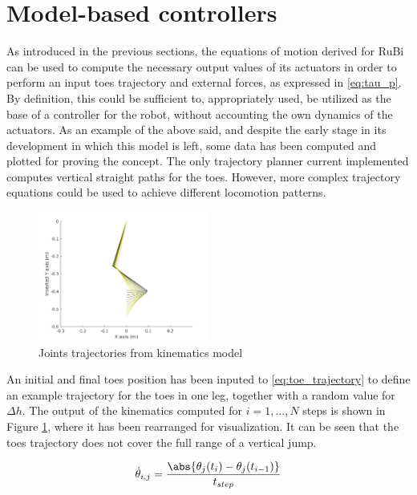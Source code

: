 
\section{Model-based controllers}
\label{sec_dynamic_controller}
As introduced in the previous sections, the equations of motion derived for RuBi can be used to compute the necessary output values of its actuators in order to perform an input toes trajectory and external forces, as expressed in \ref{eq:tau_p}.
By definition, this could be sufficient to, appropriately used, be utilized as the base of a controller for the robot, without accounting the own dynamics of the actuators.
As an example of the above said, and despite the early stage in its development in which this model is left, some data has been computed and plotted for proving the concept.
The only trajectory planner current implemented computes vertical straight paths for the toes.
However, more complex trajectory equations could be used to achieve different locomotion patterns.

\begin{figure}[h]
	\centering
	\includegraphics[width=0.5\textwidth]{figures/kinematics_sim.pdf}
	\caption{Joints trajectories from kinematics model}
	\label{fig:controller_position}
\end{figure}

An initial and final toes position has been inputed to \ref{eq:toe_trajectory} to define an example trajectory for the toes in one leg, together with a random value for $\Delta h$.
The output of the kinematics computed for $i=1,...,N$ steps is shown in Figure \ref{fig:controller_position}, where it has been rearranged for visualization.
It can be seen that the toes trajectory does not cover the full range of a vertical jump.

\begin{equation}
\label{eq:joint_vel}
	\dot{\theta}_{i,j} =\frac{ \abs{ \theta_{j}(t_{i}) - \theta_{j}(t_{i-1}) } }{ t_{step} }
\end{equation}


